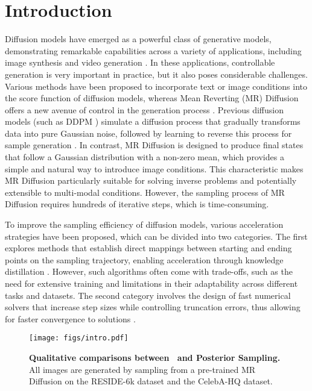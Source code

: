 \section{Introduction}

Diffusion models have emerged as a powerful class of generative models, demonstrating remarkable capabilities across a variety of applications, including image synthesis \citep{dhariwal2021diffusion,ruiz2023dreambooth,rombach2022high} and video generation \citep{ho2022imagen,ho2022video}.  
In these applications, controllable generation is very important in practice, but it also poses considerable challenges. Various methods have been proposed to incorporate text or image conditions into the score function of diffusion models\citep{ho2022cfg,ye2023ipadapter,zhang2023controlnet}, whereas Mean Reverting (MR) Diffusion offers a new avenue of control in the generation process \citep{luo2023mrsde}. Previous diffusion models (such as DDPM \citep{ho2020ddpm}) simulate a diffusion process that gradually transforms data into pure Gaussian noise, followed by learning to reverse this process for sample generation \citep{song2020improved,song2021maximum}. In contrast, MR Diffusion is designed to produce final states that follow a Gaussian distribution with a non-zero mean, which provides a simple and natural way to introduce image conditions. This characteristic makes MR Diffusion particularly suitable for solving inverse problems and potentially extensible to multi-modal conditions. However, the sampling process of MR Diffusion requires hundreds of iterative steps, which is time-consuming.


To improve the sampling efficiency of diffusion models, various acceleration strategies have been proposed, which can be divided into two categories. The first explores methods that establish direct mappings between starting and ending points on the sampling trajectory, enabling acceleration through knowledge distillation \citep{salimans2022progressive,song2023consistency,liu2022flow}. However, such algorithms often come with trade-offs, such as the need for extensive training and limitations in their adaptability across different tasks and datasets. The second category involves the design of fast numerical solvers that increase step sizes while controlling truncation errors, thus allowing for faster convergence to solutions \citep{lu2022dpmsolver,zhang2022deis,song2020ddim}. 

\begin{figure*}[t]
    \centering
    \texttt{[image: figs/intro.pdf]} %
    \caption{\textbf{Qualitative comparisons between \ourmethod~and Posterior Sampling.} All images are generated by sampling from a pre-trained MR Diffusion \citep{luo2024daclip} on the RESIDE-6k \citep{qin2020hazydata} dataset and the CelebA-HQ \citep{karras2017celebaHQ} dataset.}
    \label{fig:intro}
\end{figure*}



